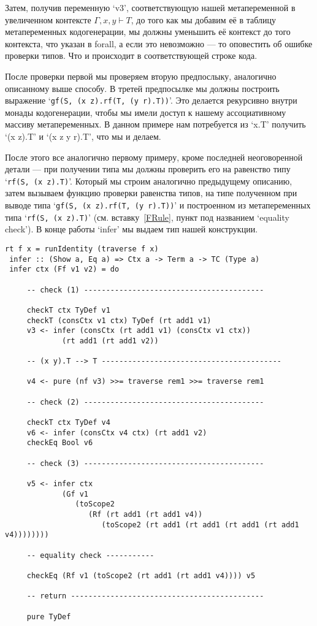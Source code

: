 Затем, получив переменную `v3', соответствующую нашей метапеременной в увеличенном контексте $\Gamma, x, y \vdash T$, до того как мы добавим её в таблицу метапеременных кодогенерации, мы должны уменьшить её контекст до того контекста, что указан в forall, а если это невозможно --- то оповестить об ошибке проверки типов. Что и происходит в соответствующей строке кода.

После проверки первой мы проверяем вторую предпослыку, аналогично описанному выше способу. В третей предпосылке мы должны построить выражение `\lstinline{gf(S, (x z).rf(T, (y r).T))}'. Это делается рекурсивно внутри монады кодогенерации, чтобы мы имели доступ к нашему ассоциативному массиву метапеременных. В данном примере нам потребуется из `x.T' получить `(x z).T' и `(x z y r).T', что мы и делаем.

После этого все аналогично первому примеру, кроме последней неоговоренной детали --- при получении типа мы должны проверить его на равенство типу  `\lstinline{rf(S, (x z).T)}'. Который мы строим аналогично предыдущему описанию, затем вызываем функцию проверки равенства типов, на типе полученном при выводе типа `\lstinline{gf(S, (x z).rf(T, (y r).T))}' и построенном из метапеременных типа `\lstinline{rf(S, (x z).T)}' (см. вставку~\ref{FRule}, пункт под названием `equality check'). В конце работы `infer' мы выдаем тип нашей конструкции.

\begin{lstlisting}[caption={Искусственный пример случая несоответствия контекстов: контекст t нужно сократить до использования в предпосылке.},label={FRule},captionpos=b, frame=single, float, floatplacement=H]
 rt f x = runIdentity (traverse f x)
 infer :: (Show a, Eq a) => Ctx a -> Term a -> TC (Type a)
 infer ctx (Ff v1 v2) = do

     -- check (1) -----------------------------------------

     checkT ctx TyDef v1
     checkT (consCtx v1 ctx) TyDef (rt add1 v1)
     v3 <- infer (consCtx (rt add1 v1) (consCtx v1 ctx))
             (rt add1 (rt add1 v2))

     -- (x y).T --> T -----------------------------------------

     v4 <- pure (nf v3) >>= traverse rem1 >>= traverse rem1

     -- check (2) -----------------------------------------

     checkT ctx TyDef v4
     v6 <- infer (consCtx v4 ctx) (rt add1 v2)
     checkEq Bool v6

     -- check (3) -----------------------------------------

     v5 <- infer ctx
             (Gf v1
                (toScope2
                   (Rf (rt add1 (rt add1 v4))
                      (toScope2 (rt add1 (rt add1 (rt add1 (rt add1 v4))))))))

     -- equality check -----------

     checkEq (Rf v1 (toScope2 (rt add1 (rt add1 v4)))) v5

     -- return --------------------------------------------

     pure TyDef
\end{lstlisting}
